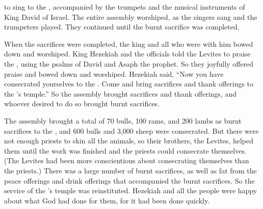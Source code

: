 {to sing
to the
{},
accompanied by the trumpets
and the musical
instruments of King
David
of Israel.
The entire
assembly
worshiped,
as the singers
sang
and the trumpeters
played.
They continued until
the burnt sacrifice
was completed.
\par }{\PP {}When
the sacrifices
were completed,
the king
and all
who were
with
him bowed down and worshiped.
King
Hezekiah
and the officials
told
the Levites
to praise
the {}, using the psalms
of David
and Asaph
the prophet.
So they joyfully
offered praise
and bowed
down and worshiped.
Hezekiah
said,
“Now
you have consecrated
yourselves to the
{}. Come
and bring
sacrifices
and thank offerings
to the
{}’s
temple.”
So the assembly
brought
sacrifices
and thank offerings,
and whoever
desired to do so brought burnt sacrifices.
\par }{\PP {}The assembly
brought
a total
of 70
bulls,
100
rams,
and 200
lambs
as burnt sacrifices
to the
{},
and 600
bulls
and 3,000
sheep
were consecrated.
But
there were
not
enough
priests
to skin all
the animals, so their brothers,
the Levites,
helped
them until
the work
was finished
and the priests
could consecrate
themselves. (The Levites
had been more conscientious
about
consecrating themselves than
the priests.)
There was a large number
of burnt sacrifices,
as well as
fat
from the peace offerings
and drink offerings
that accompanied the burnt sacrifices.
So
the service
of the
{}’s
temple
was reinstituted.
Hezekiah
and all
the people
were happy
about what
God
had
done
for them, for
it had been done quickly.

\par }
